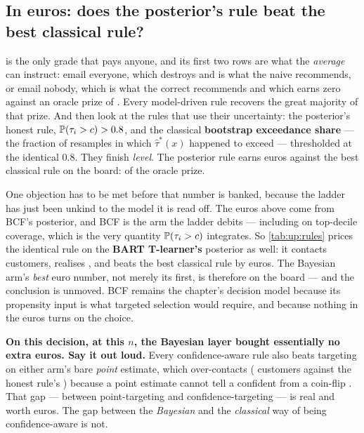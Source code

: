 \subsection*{In euros: does the posterior's rule beat the best classical rule?}



 is the only grade that pays anyone, and its first two rows are what the
\emph{average} can instruct: email everyone, which destroys \eur{\nbOneTreatAllLoss} and is what the
naive \eur{\nbOneNaiveEst} recommends, or email nobody, which is what the correct \eur{\nbOneTrueAte}
recommends and which earns zero against an oracle prize of \eur{\nbOneOracleProfit}. Every
model-driven rule recovers the great majority of that prize. And then look at the rules that
use their uncertainty: the posterior's honest rule, $\operatorname{\mathbb{P}}(\tau_i > c) > 0.8$, and the classical
\textbf{bootstrap exceedance share} --- the fraction of resamples in which $\hat\tau^*(x)$
happened to exceed \eur{\nbOneCost} --- thresholded at the identical $0.8$. They finish
\emph{level}. The posterior rule earns \nbOneBayesEdge{} euros against the best classical rule on
the board: \pc{\nbOneBayesEdgePct} of the oracle prize.

One objection has to be met before that number is banked, because the ladder has just been unkind to
the model it is read off. The euros above come from BCF's posterior, and BCF is the arm the ladder
debits --- including on top-decile coverage, which is the very quantity $\operatorname{\mathbb{P}}(\tau_i > c)$
integrates. So \cref{tab:up:rules} prices the identical rule on the \textbf{BART T-learner's}
posterior as well: it contacts \nbOneBartRuleN{} customers, realises \eur{\nbOneBartRuleProfit}, and
beats the best classical rule by \nbOneBartRuleEdge{} euros. The Bayesian arm's \emph{best} euro
number, not merely its first, is therefore on the board --- and the conclusion is unmoved. BCF
remains the chapter's decision model because its propensity input is what targeted selection would
require, and because nothing in the euros turns on the choice.

\textbf{On this decision, at this $n$, the Bayesian layer bought essentially no extra euros. Say
it out loud.} Every confidence-aware rule also beats targeting on either arm's bare \emph{point}
estimate, which over-contacts (\nbOnePointRuleN{} customers against the honest rule's
\nbOneBayesRuleN) because a point estimate cannot tell a confident  from a coin-flip
. That gap --- between point-targeting and confidence-targeting --- is real and worth euros.
The gap between the \emph{Bayesian} and the \emph{classical} way of being confidence-aware is not.

